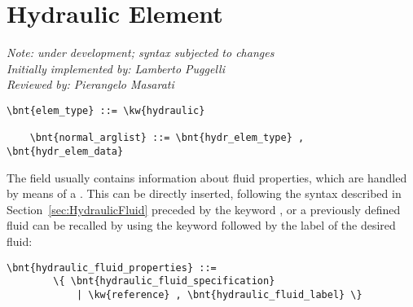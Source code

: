 % 
% 
% 
% 
% 
% 
% 
% 
% 

\section{Hydraulic Element}
\label{sec:EL:HYDR}
{\em 
    Note: under development; syntax subjected to changes \\
    Initially implemented by: Lamberto Puggelli \\
    Reviewed by: Pierangelo Masarati
}

\begin{Verbatim}[commandchars=\\\{\}]
    \bnt{elem_type} ::= \kw{hydraulic}

    \bnt{normal_arglist} ::= \bnt{hydr_elem_type} , \bnt{hydr_elem_data}
\end{Verbatim}
The field  usually contains information
about fluid properties, which are handled by means of a .
This can be directly inserted, following the syntax described in
Section~\ref{sec:HydraulicFluid} preceded by the keyword , or a
previously defined fluid can be recalled by using the keyword 
 followed by the label of the desired fluid:
\begin{Verbatim}[commandchars=\\\{\}]
    \bnt{hydraulic_fluid_properties} ::=
        \{ \bnt{hydraulic_fluid_specification}
            | \kw{reference} , \bnt{hydraulic_fluid_label} \}
\end{Verbatim}



